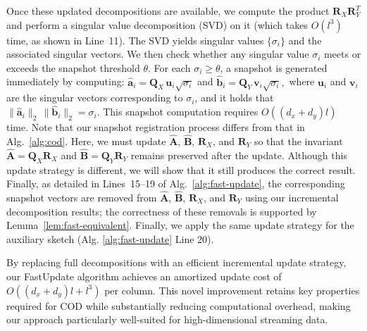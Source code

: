 Once these updated decompositions are available, we compute the product \(\boldsymbol{R}_X\boldsymbol{R}_Y^T\) and perform a singular value decomposition (SVD) on it (which takes \(O(l^3)\) time, as shown in Line~11). The SVD yields singular values \(\{\sigma_i\}\) and the associated singular vectors. We then check whether any singular value \(\sigma_i\) meets or exceeds the snapshot threshold \(\theta\). For each \(\sigma_i \ge \theta\), a snapshot is generated immediately by computing:
\(
\hat{\boldsymbol{a}}_i = \boldsymbol{Q}_X\,\boldsymbol{u}_i\sqrt{\sigma_i}\) and  \(\hat{\boldsymbol{b}}_i = \boldsymbol{Q}_Y\,\boldsymbol{v}_i\sqrt{\sigma_i},
\)
where \(\boldsymbol{u}_i\) and \(\boldsymbol{v}_i\) are the singular vectors corresponding to \(\sigma_i\), and it holds that
\(
\|\hat{\boldsymbol{a}}_i\|_2 \,\|\hat{\boldsymbol{b}}_i\|_2 = \sigma_i.
\)
This snapshot computation requires \(O((d_x+d_y)l)\) time. Note that our snapshot registration process differs from that in Alg.\ \ref{alg:cod}. Here, we must update \(\hat{\boldsymbol{A}}\), \(\hat{\boldsymbol{B}}\), \(\boldsymbol{R}_X\), and \(\boldsymbol{R}_Y\) so that the invariant
\(
\hat{\boldsymbol{A}} = \boldsymbol{Q}_X\boldsymbol{R}_X\) and \(\hat{\boldsymbol{B}} = \boldsymbol{Q}_Y\boldsymbol{R}_Y
\)
remains preserved after the update. Although this update strategy is different, we will show that it still produces the correct result. Finally, as detailed in Lines~15–19 of Alg.\ \ref{alg:fast-update}, the corresponding snapshot vectors are removed from \(\hat{\boldsymbol{A}}\), \(\hat{\boldsymbol{B}}\), \(\boldsymbol{R}_X\), and \(\boldsymbol{R}_Y\) using our incremental decomposition results; the correctness of these removals is supported by Lemma~\ref{lem:fast-equivalent}. Finally, we apply the same update strategy for the auxiliary sketch (Alg. \ref{alg:fast-update} Line 20).  

By replacing full decompositions with an efficient incremental update strategy, our FastUpdate algorithm achieves an amortized update cost of \(O((d_x+d_y)l + l^3)\) per column. This novel improvement retains key properties required for COD while substantially reducing computational overhead, making our approach particularly well-suited for high-dimensional streaming data.






